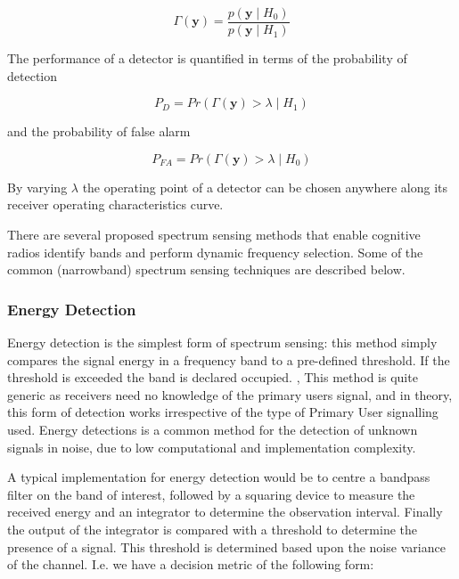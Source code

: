 \begin{equation}
\Gamma\left(\textbf{y}\right) = \frac{p\left(\textbf{y}\mid H_0\right)}{p\left(\textbf{y}\mid H_1\right)}
\end{equation}

The performance of a detector is quantified in terms of the probability of detection

\begin{equation}
P_{D} = Pr\left( \Gamma\left(\textbf{y}\right) > \lambda \mid H_1\right)
\end{equation}

and the probability of false alarm 

\begin{equation}
P_{FA} = Pr\left( \Gamma\left(\textbf{y}\right) > \lambda \mid H_0\right)
\end{equation}

By varying \(\lambda\) the operating point of a detector can be chosen anywhere along its receiver operating characteristics curve.

There are several proposed spectrum sensing methods that enable cognitive radios identify bands and perform dynamic frequency selection. Some of the common (narrowband) spectrum sensing techniques are described below.

\subsubsection{Energy Detection}

Energy detection is the simplest form of spectrum sensing: this method simply compares the signal energy in a frequency band to a pre-defined threshold. If the threshold is exceeded the band is declared occupied. , This method is quite generic as receivers need no knowledge of the primary users signal, and in theory, this form of detection works irrespective of the type of Primary User signalling used. Energy detections is a common method for the detection of unknown signals in noise, due to low computational and implementation complexity. 

A typical implementation
 for energy detection would be to centre a bandpass filter on the band of interest, followed by a squaring device to measure the received energy and an integrator to determine the observation interval. Finally the output of the integrator is compared with a threshold to determine the presence of a signal. This threshold is determined based upon the noise variance of the channel. I.e. we have a decision metric of the following form:

